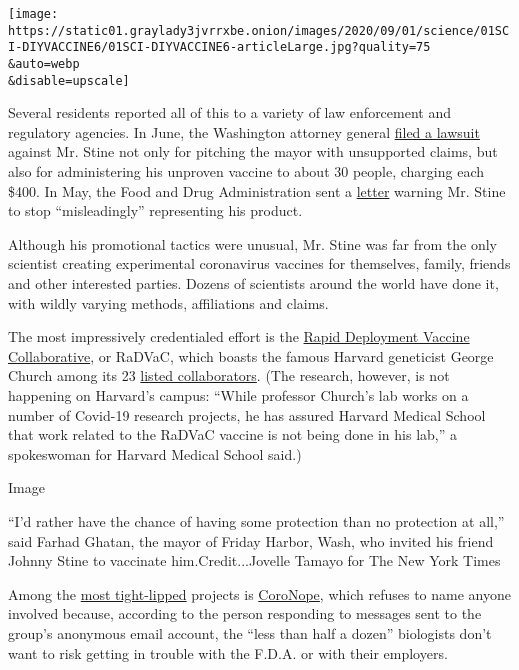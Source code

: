 \texttt{[image: https://static01.graylady3jvrrxbe.onion/images/2020/09/01/science/01SCI-DIYVACCINE6/01SCI-DIYVACCINE6-articleLarge.jpg?quality=75\\\&auto=webp\\\&disable=upscale]}

Several residents reported all of this to a variety of law enforcement
and regulatory agencies. In June, the Washington attorney general
\href{https://www.atg.wa.gov/news/news-releases/ag-ferguson-files-lawsuit-against-seattle-business-marketed-and-sold-covid-19}{filed
a lawsuit} against Mr. Stine not only for pitching the mayor with
unsupported claims, but also for administering his unproven vaccine to
about 30 people, charging each \$400. In May, the Food and Drug
Administration sent a
\href{https://www.fda.gov/inspections-compliance-enforcement-and-criminal-investigations/warning-letters/north-coast-biologics-607532-05212020}{letter}
warning Mr. Stine to stop ``misleadingly'' representing his product.

Although his promotional tactics were unusual, Mr. Stine was far from
the only scientist creating experimental coronavirus vaccines for
themselves, family, friends and other interested parties. Dozens of
scientists around the world have done it, with wildly varying methods,
affiliations and claims.

The most impressively credentialed effort is the
\href{https://radvac.org/vaccine/}{Rapid Deployment Vaccine
Collaborative}, or RaDVaC, which boasts the famous Harvard geneticist
George Church among its 23
\href{https://radvac.org/wp-content/uploads/2020/08/White-Paper-SARS-CoV-2-vaccine-ver-3-0-1.pdf}{listed
collaborators}. (The research, however, is not happening on Harvard's
campus: ``While professor Church's lab works on a number of Covid-19
research projects, he has assured Harvard Medical School that work
related to the RaDVaC vaccine is not being done in his lab,'' a
spokeswoman for Harvard Medical School said.)

Image

``I'd rather have the chance of having some protection than no
protection at all,'' said Farhad Ghatan, the mayor of Friday Harbor,
Wash, who invited his friend Johnny Stine to vaccinate
him.Credit...Jovelle Tamayo for The New York Times

Among the
\href{https://reason.com/video/biohackers-are-on-a-secret-hunt-for-the-coronavirus-vaccine/}{most
tight-lipped} projects is
\href{https://siasky.net/bACLKGmcmX4NCp47WwOOJf0lU666VLeT5HRWpWVtqZPjEA}{CoroNope},
which refuses to name anyone involved because, according to the person
responding to messages sent to the group's anonymous email account, the
``less than half a dozen'' biologists don't want to risk getting in
trouble with the F.D.A. or with their employers.

